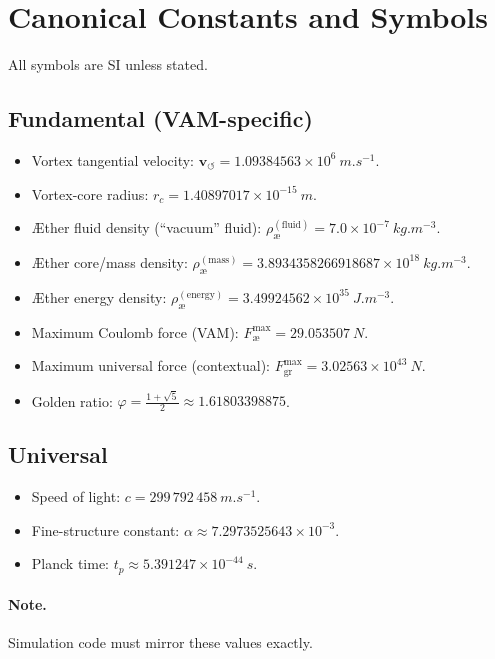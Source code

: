 \documentclass[11pt,a4paper]{article}
\begin{document}
    \section{Canonical Constants and Symbols}
    All symbols are SI unless stated.

    \subsection{Fundamental (VAM-specific)}
    \begin{itemize}
        \item Vortex tangential velocity: $\mathbf{v}_{\scriptscriptstyle\boldsymbol{\circlearrowleft}} = 1.09384563 \times 10^{6}\ \si{m.s^{-1}}$.
        \item Vortex-core radius: $r_c = 1.40897017 \times 10^{-15}\ \si{m}$.
        \item Æther fluid density (``vacuum'' fluid): $\rho_{\text{\ae}}^{(\text{fluid})} = 7.0 \times 10^{-7}\ \si{kg.m^{-3}}$.
        \item Æther core/mass density: $\rho_{\text{\ae}}^{(\text{mass})} = 3.8934358266918687 \times 10^{18}\ \si{kg.m^{-3}}$.
        \item Æther energy density: $\rho_{\text{\ae}}^{(\text{energy})} = 3.49924562 \times 10^{35}\ \si{J.m^{-3}}$.
        \item Maximum Coulomb force (VAM): $F_{\text{\ae}}^{\max} = 29.053507\ \si{N}$.
        \item Maximum universal force (contextual): $F_{\text{gr}}^{\max} = 3.02563 \times 10^{43}\ \si{N}$.
        \item Golden ratio: $\varphi = \frac{1+\sqrt{5}}{2} \approx 1.61803398875$.
    \end{itemize}

    \subsection{Universal}
    \begin{itemize}
        \item Speed of light: $c = 299\,792\,458\ \si{m.s^{-1}}$.
        \item Fine-structure constant: $\alpha \approx 7.2973525643 \times 10^{-3}$.
        \item Planck time: $t_p \approx 5.391247 \times 10^{-44}\ \si{s}$.
    \end{itemize}

    \paragraph{Note.} Simulation code must mirror these values exactly.
\end{document}
